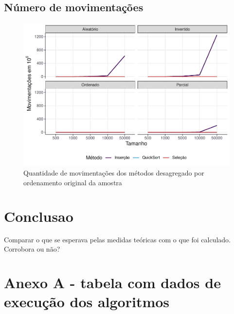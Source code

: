 \documentclass[
]{article}
\begin{document}
\hypertarget{nuxfamero-de-movimentauxe7uxf5es}{%
\subsection{Número de
movimentações}\label{nuxfamero-de-movimentauxe7uxf5es}}

\begin{figure}

{\centering \includegraphics[width=0.75\linewidth]{relatorio_tp1_files/figure-latex/grafico-movimentacoes-1} 

}

\caption{Quantidade de movimentações dos métodos desagregado por ordenamento original da amostra}\label{fig:grafico-movimentacoes}
\end{figure}

\hypertarget{conclusao}{%
\section{Conclusao}\label{conclusao}}

Comparar o que se esperava pelas medidas teóricas com o que foi
calculado. Corrobora ou não?

\hypertarget{anexo-a---tabela-com-dados-de-execuuxe7uxe3o-dos-algoritmos}{%
\section*{Anexo A - tabela com dados de execução dos
algoritmos}\label{anexo-a---tabela-com-dados-de-execuuxe7uxe3o-dos-algoritmos}}
\end{document}
